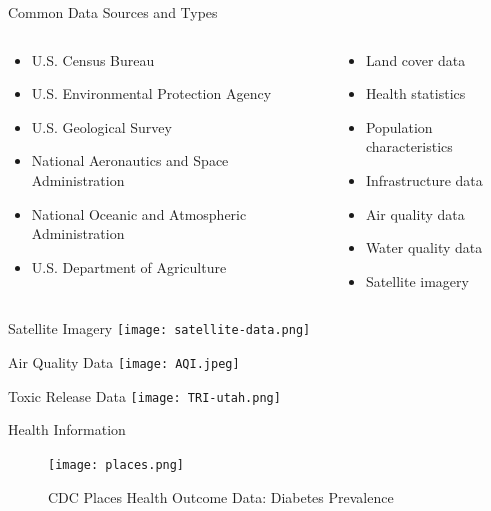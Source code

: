 \documentclass[
  ignorenonframetext,
]{beamer}
\providecommand{\tightlist}{%
  \setlength{\itemsep}{0pt}\setlength{\parskip}{0pt}}\usepackage{longtable,booktabs,array}
\begin{document}
\begin{frame}{Common Data Sources and Types}
\label{common-data-sources-and-types}
\begin{columns}[T]
\begin{column}{0.5\textwidth}
\begin{itemize}
\tightlist
\item
  U.S. Census Bureau
\item
  U.S. Environmental Protection Agency
\item
  U.S. Geological Survey
\item
  National Aeronautics and Space Administration
\item
  National Oceanic and Atmospheric Administration
\item
  U.S. Department of Agriculture
\end{itemize}
\end{column}

\begin{column}{0.5\textwidth}
\begin{itemize}
\tightlist
\item
  Land cover data
\item
  Health statistics
\item
  Population characteristics
\item
  Infrastructure data
\item
  Air quality data
\item
  Water quality data
\item
  Satellite imagery
\end{itemize}
\end{column}
\end{columns}
\end{frame}

\begin{frame}{Satellite Imagery}
\label{satellite-imagery}
\texttt{[image: satellite-data.png]}
\end{frame}

\begin{frame}{Air Quality Data}
\label{air-quality-data}
\texttt{[image: AQI.jpeg]}
\end{frame}

\begin{frame}{Toxic Release Data}
\label{toxic-release-data}
\texttt{[image: TRI-utah.png]}
\end{frame}

\begin{frame}{Health Information}
\label{health-information}
\begin{figure}[H]

{\centering \texttt{[image: places.png]}

}

\caption{CDC Places Health Outcome Data: Diabetes Prevalence}

\end{figure}%
\end{frame}
\end{document}
